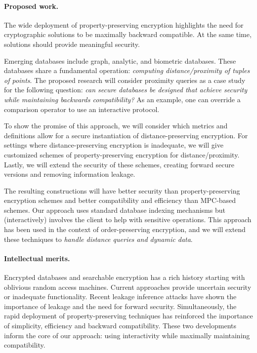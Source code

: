 \documentclass[11pt]{article}
\begin{document}
\paragraph{Proposed work.}
The wide deployment of property-preserving encryption highlights the need for cryptographic solutions to be maximally backward compatible.  At the same time, solutions should provide meaningful security.

Emerging databases include graph, analytic, and
biometric databases. These databases share a fundamental operation: {\em
computing distance/proximity of tuples of points}. The proposed research will
consider proximity queries as a case study for the following question: \emph{can secure databases be designed that achieve security while maintaining backwards compatibility?}  As an example, one can override a comparison operator to use an interactive protocol.

To show the promise of this approach, we will consider which metrics and definitions allow for a secure instantiation of distance-preserving encryption. For settings where distance-preserving encryption is inadequate, we will give
customized schemes of property-preserving encryption for distance/proximity. Lastly, we will extend the security of these schemes, creating forward secure versions and removing information leakage.

The resulting constructions will have
better security than property-preserving encryption schemes and better compatibility and 
efficiency than MPC-based schemes. Our approach uses standard database indexing mechanisms but (interactively) involves the
client to help with sensitive operations. This approach has been used in the
context of order-preserving encryption, and we will extend these techniques to
{\em handle distance queries and dynamic data}.

%
%

\paragraph{Intellectual merits.}  
Encrypted databases and searchable encryption has a rich history starting with  oblivious random access machines.  Current approaches provide uncertain security or inadequate functionality.  Recent
leakage inference attacks have shown the importance of leakage and the need for forward
security.  Simultaneously, the rapid deployment of property-preserving
techniques has reinforced the importance of simplicity, efficiency and backward
compatibility.  These two developments inform the core of our approach: using
interactivity while maximally maintaining compatibility.
\end{document}
